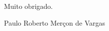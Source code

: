 \documentclass[pdftex, brazil, 12pt, oneside]{article}
\begin{document}
Muito obrigado.

\vspace{0.5 cm}

Paulo Roberto Merçon de Vargas









\end{document}
